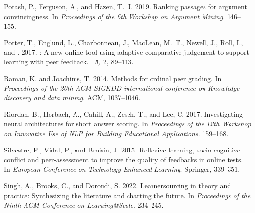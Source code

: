 \documentclass[notitlepage,12pt]{jedm}
\begin{document}
\begin{thebibliography}{}
{\sc Potash, P.}, {\sc Ferguson, A.}, {\sc and} {\sc Hazen, T.~J.} 2019.
\newblock Ranking passages for argument convincingness.
\newblock In {\em Proceedings of the 6th {Workshop} on {Argument} {Mining}}.
  146--155.

{\sc Potter, T.}, {\sc Englund, L.}, {\sc Charbonneau, J.}, {\sc MacLean,
  M.~T.}, {\sc Newell, J.}, {\sc Roll, I.}, {\sc and} {}. 2017.
: {A} new online tool using adaptive comparative judgement
  to support learning with peer feedback.
~{\em 5,\/}~2, 89--113.

{\sc Raman, K.} {\sc and} {\sc Joachims, T.} 2014.
\newblock Methods for ordinal peer grading.
\newblock In {\em Proceedings of the 20th {ACM} {SIGKDD} international
  conference on {Knowledge} discovery and data mining}. ACM, 1037--1046.

{\sc Riordan, B.}, {\sc Horbach, A.}, {\sc Cahill, A.}, {\sc Zesch, T.}, {\sc
  and} {\sc Lee, C.} 2017.
\newblock Investigating neural architectures for short answer scoring.
\newblock In {\em Proceedings of the 12th {Workshop} on {Innovative} {Use} of
  {NLP} for {Building} {Educational} {Applications}}. 159--168.

{\sc Silvestre, F.}, {\sc Vidal, P.}, {\sc and} {\sc Broisin, J.} 2015.
\newblock Reflexive learning, socio-cognitive conflict and peer-assessment to
  improve the quality of feedbacks in online tests.
\newblock In {\em European Conference on Technology Enhanced Learning}.
  Springer, 339--351.

{\sc Singh, A.}, {\sc Brooks, C.}, {\sc and} {\sc Doroudi, S.} 2022.
\newblock Learnersourcing in theory and practice: Synthesizing the literature
  and charting the future.
\newblock In {\em Proceedings of the Ninth ACM Conference on Learning@Scale}.
  234--245.


\end{thebibliography}
\end{document}

